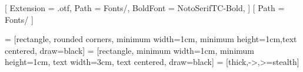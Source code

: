\usepackage{xeCJK}
\usepackage{fontspec}
    [
        Extension = .otf,
        Path = Fonts/,
        BoldFont = NotoSerifTC-Bold,
    ]
    [
        Path = Fonts/
    ]

\usepackage[vmargin=1in]{geometry}
\pagestyle{empty}

\renewcommand\thesection{\S}
\renewcommand\thesubsection{\arabic{subsection}}
\renewcommand{\arraystretch}{1.1}

\usepackage{amsmath, amsfonts, amssymb, amsthm}
    \newtheorem{ax}{Axiom}
    \newtheorem*{cl}{Corollary}
    \newtheorem*{con}{Conclusion}
    \newtheorem{clm}{Claim}
    \newtheorem{df}{Definition}
    \newtheorem{ex}{Example}
    \newtheorem{exs}{Exercise}
    \newtheorem{lm}{Lemma}
    \newtheorem{pr}{Principle}
    \newtheorem{pp}{Property}
    \newtheorem{pro}{Problem}
    \newtheorem{prop}{Proposition}
    \newtheorem*{rem}{Remark}
    \newtheorem{sol}{Solution}
    \newtheorem{thm}{Theorem}
    \newtheorem{ans}{Answer}

\usepackage{enumerate}
\usepackage{graphicx}
\usepackage{xcolor}
\usepackage{url}
\usepackage{subcaption}
\usepackage[justification=centering]{caption}
\usepackage{float}
\usepackage{multicol}
\usepackage{tikz}
\usetikzlibrary{shapes.geometric, arrows}
 = [rectangle, rounded corners, minimum width=1cm, minimum height=1cm,text centered, draw=black]
 = [rectangle, minimum width=1cm, minimum height=1cm, text width=3cm, text centered, draw=black]
 = [thick,->,>=stealth]